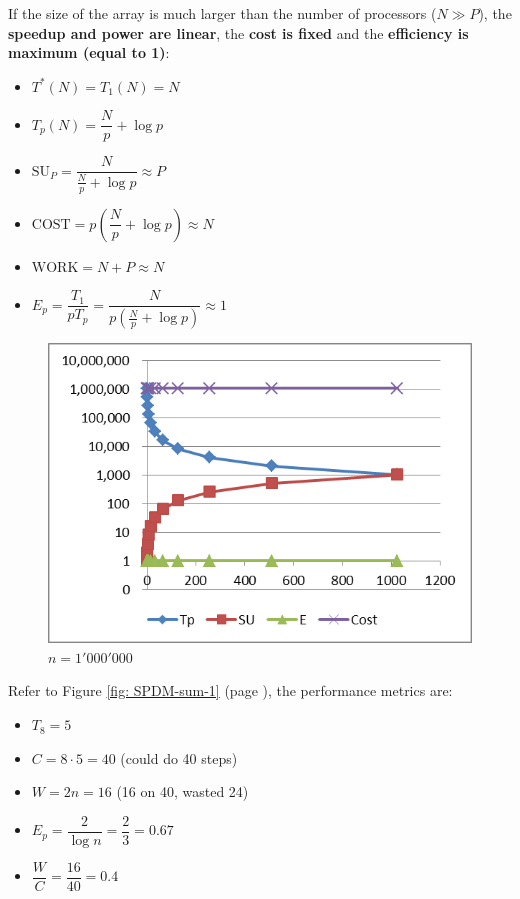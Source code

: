 \newpage

\noindent
If the size of the array is much larger than the number of processors ($N \gg P$), the \textbf{speedup and power are linear}, the \textbf{cost is fixed} and the \textbf{efficiency is maximum (equal to 1)}:
\begin{itemize}
    \item $T^{*}\left(N\right) = T_{1}\left(N\right) = N$
    \item $T_{p}\left(N\right) = \dfrac{N}{p} + \log p$
    \item $\mathrm{SU}_{P} = \dfrac{N}{\frac{N}{p}+\log p} \approx P$
    \item $\text{COST} = p\left(\dfrac{N}{p} + \log p\right) \approx N$
    \item $\text{WORK} = N + P \approx N$
    \item $E_{p} = \dfrac{T_{1}}{pT_{p}} = \dfrac{N}{p\left(\frac{N}{p} + \log p\right)} \approx 1$
\end{itemize}
\begin{figure}[!htp]
    \centering
    \includegraphics[width=.5\linewidth]{img/SPDM-sum-4.png}
    \caption*{$n = 1'000'000$}
\end{figure}

\begin{examplebox}
    Refer to Figure \ref{fig: SPDM-sum-1} (page \pageref{fig: SPDM-sum-1}), the performance metrics are:
    \begin{itemize}
        \item $T_{8} = 5$
        \item $C = 8 \cdot 5 = 40$ (could do 40 steps)
        \item $W = 2n = 16$ (16 on 40, wasted 24)
        \item $E_{p} = \dfrac{2}{\log n} = \dfrac{2}{3} = 0.67$
        \item $\dfrac{W}{C} = \dfrac{16}{40} = 0.4$
    \end{itemize}
\end{examplebox}

